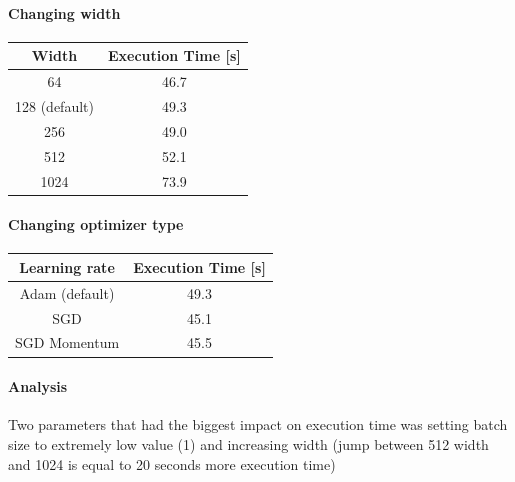     \paragraph{Changing width}
    \begin{center}
        \begin{tabular}{ | c | c |  }
            \hline
         Width & Execution Time [s] \\ 
         \hline
         64 & 46.7 \\  
         \hline
         128 (default) & 49.3 \\    
         \hline
         256 & 49.0 \\    
         \hline
         512 & 52.1 \\    
         \hline
         1024 & 73.9 \\    
         \hline
    \end{tabular}
    \end{center}

    \paragraph{Changing optimizer type}
    \begin{center}
        \begin{tabular}{ | c | c |  }
            \hline
         Learning rate & Execution Time [s] \\ 
         \hline
         Adam (default) & 49.3 \\  
         \hline
         SGD & 45.1 \\    
         \hline
         SGD Momentum & 45.5 \\    
         \hline
    \end{tabular}
    \end{center}

    \paragraph{Analysis}
    Two parameters that had the biggest impact on execution time was setting batch size to extremely low value (1) and increasing width (jump between 512 width and 1024 is equal to 20 seconds more execution time)


